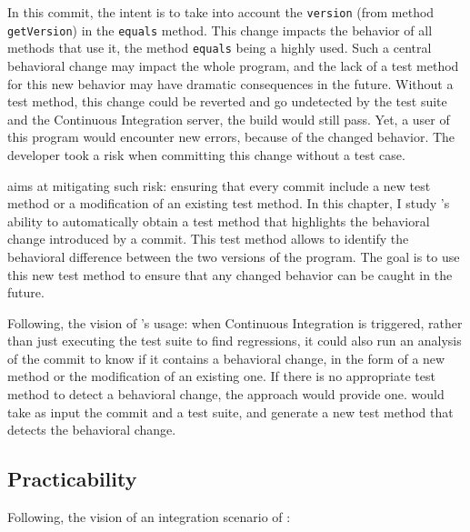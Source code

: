 In this commit, the intent is to take into account the \texttt{version} (from method \texttt{getVersion}) in the \texttt{equals} method.
This change impacts the behavior of all methods that use it, the method \texttt{equals} being a highly used.
Such a central behavioral change may impact the whole program, and the lack of a test method for this new behavior may have dramatic consequences in the future.
Without a test method, this change could be reverted and go undetected by the test suite and the Continuous Integration server, \ie the build would still pass.
Yet, a user of this program would encounter new errors, because of the changed behavior.
The developer took a risk when committing this change without a test case.

\DCI aims at mitigating such risk: 
ensuring that every commit include a new test method or a modification of an existing test method.
In this chapter, I study \dspot's ability to automatically obtain a test method that highlights the behavioral change introduced by a commit.
This test method allows to identify the behavioral difference between the two versions of the program. 
The goal is to use this new test method to ensure that any changed behavior can be caught in the future.

Following, the vision of \DCI's usage:
when Continuous Integration is triggered, 
rather than just executing the test suite to find regressions, 
it could also run an analysis of the commit to know if it contains a behavioral change, 
in the form of a new method or the modification of an existing one.
If there is no appropriate test method to detect a behavioral change, the approach would provide one. 
\DCI would take as input the commit and a test suite, and generate a new test method that detects the behavioral change.

\subsection{Practicability}
\label{subsec:dci:background:practicability}

Following, the vision of an integration scenario of \DCI:

